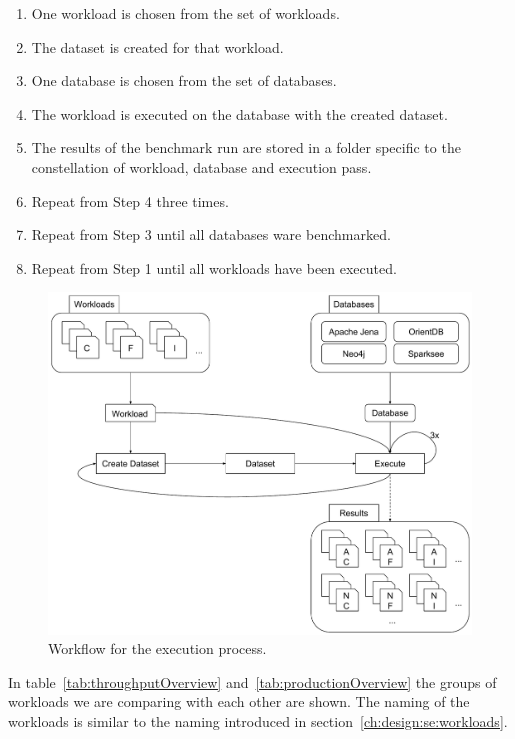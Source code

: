 \begin{enumerate}[label=Step \arabic*:,widest=Step 1,leftmargin=*]
  \item One workload is chosen from the set of workloads.
  \item The dataset is created for that workload.
  \item One database is chosen from the set of databases.
  \item The workload is executed on the database with the created dataset.
  \item The results of the benchmark run are stored in a folder specific to the constellation of workload,
  database and execution pass.
  \item Repeat from Step 4 three times.
  \item Repeat from Step 3 until all databases ware benchmarked.
  \item Repeat from Step 1 until all workloads have been executed.
\end{enumerate}

\begin{figure}[!h]
  \includegraphics[width=\textwidth]{images/executionWorkflow}
  \caption{Workflow for the execution process.}
  \label{fig:executionWorkflow}
\end{figure}

In table~\ref{tab:throughputOverview} and~\ref{tab:productionOverview} the groups of workloads we are comparing with each other are shown.
The naming of the workloads is similar to the naming introduced in section~\ref{ch:design:se:workloads}.

